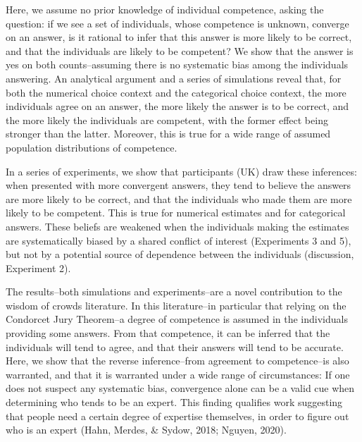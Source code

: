 \documentclass[
  doc,floatsintext]{apa6}
\begin{document}
Here, we assume no prior knowledge of individual competence, asking the question: if we see a set of individuals, whose competence is unknown, converge on an answer, is it rational to infer that this answer is more likely to be correct, and that the individuals are likely to be competent? We show that the answer is yes on both counts--assuming there is no systematic bias among the individuals answering. An analytical argument and a series of simulations reveal that, for both the numerical choice context and the categorical choice context, the more individuals agree on an answer, the more likely the answer is to be correct, and the more likely the individuals are competent, with the former effect being stronger than the latter. Moreover, this is true for a wide range of assumed population distributions of competence.

In a series of experiments, we show that participants (UK) draw these inferences: when presented with more convergent answers, they tend to believe the answers are more likely to be correct, and that the individuals who made them are more likely to be competent. This is true for numerical estimates and for categorical answers. These beliefs are weakened when the individuals making the estimates are systematically biased by a shared conflict of interest (Experiments 3 and 5), but not by a potential source of dependence between the individuals (discussion, Experiment 2).

The results--both simulations and experiments--are a novel contribution to the wisdom of crowds literature. In this literature--in particular that relying on the Condorcet Jury Theorem--a degree of competence is assumed in the individuals providing some answers. From that competence, it can be inferred that the individuals will tend to agree, and that their answers will tend to be accurate. Here, we show that the reverse inference--from agreement to competence--is also warranted, and that it is warranted under a wide range of circumstances: If one does not suspect any systematic bias, convergence alone can be a valid cue when determining who tends to be an expert. This finding qualifies work suggesting that people need a certain degree of expertise themselves, in order to figure out who is an expert (Hahn, Merdes, \& Sydow, 2018; Nguyen, 2020).
\end{document}
